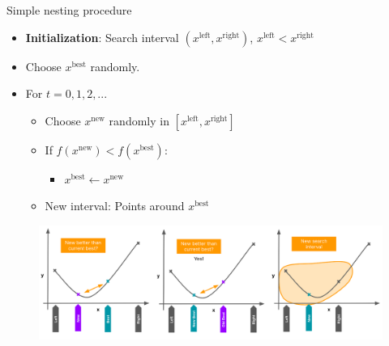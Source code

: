 \documentclass[11pt,compress,t,notes=noshow, xcolor=table]{beamer}
\begin{document}
\begin{vbframe}{Simple nesting procedure}

\begin{itemize}
\item\textbf{Initialization}: Search interval  $(x^{\text{left}}, x^{\text{right}})$, $x^{\text{left}} < x^{\text{right}}$
\item Choose $x^{\text{best}}$ randomly.
\item For $t = 0, 1, 2, ...$
\begin{itemize}
    \item Choose $x^{\text{new}}$ randomly in $[x^{\text{left}}, x^{\text{right}}]$
    \item If $f(x^{\text{new}}) < f(x^{\text{best}})$:
    \begin{itemize}
        \item $x^{\text{best}} \leftarrow x^{\text{new}}$
    \end{itemize}
    \item New interval: Points around $x^{\text{best}}$
\end{itemize}
\end{itemize}

\begin{figure}
    \centering
    \includegraphics[width=1\textwidth]{figure_man/golden-ratio-summary.png}  
\end{figure}

\end{vbframe}
\end{document}
